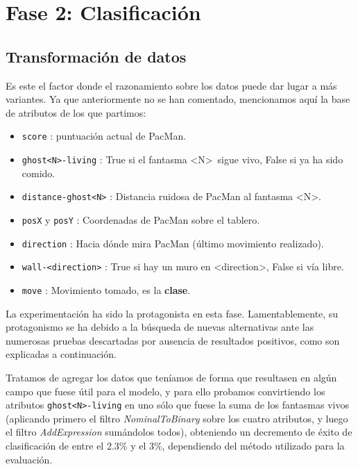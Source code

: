 \documentclass[12pt]{article}
\begin{document}
\newpage
\section{Fase 2: Clasificación}

\subsection{Transformación de datos}

Es este el factor donde el razonamiento sobre los datos puede dar lugar a más variantes. Ya que anteriormente no se han comentado, mencionamos aquí la base de atributos de los que partimos:
\begin{itemize}
    \item \texttt{score} : puntuación actual de PacMan.
    \item \texttt{ghost<N>-living} : True si el fantasma \textless N\textgreater\ sigue vivo, False si ya ha sido comido.
    \item \texttt{distance-ghost<N>} : Distancia ruidosa de PacMan al fantasma \textless N\textgreater.
    \item \texttt{posX} y \texttt{posY} : Coordenadas de PacMan sobre el tablero.
    \item \texttt{direction} : Hacia dónde mira PacMan (último movimiento realizado).
    \item \texttt{wall-<direction>} : True si hay un muro en \textless direction\textgreater, False si vía libre.
    \item \texttt{move} : Movimiento tomado, es la \textbf{clase}.
\end{itemize}

La experimentación ha sido la protagonista en esta fase. Lamentablemente, su protagonismo se ha debido a la búsqueda de nuevas alternativas ante las numerosas pruebas descartadas por ausencia de resultados positivos, como son explicadas a continuación.

\vspace{0.2cm}

Tratamos de agregar los datos que teníamos de forma que resultasen en algún campo que fuese útil para el modelo, y para ello probamos convirtiendo los atributos \texttt{ghost<N>-living} en uno sólo que fuese la suma de los fantasmas vivos (aplicando primero el filtro \emph{NominalToBinary} sobre los cuatro atributos, y luego el filtro \emph{AddExpression} sumándolos todos), obteniendo un decremento de éxito de clasificación de entre el 2.3\% y el 3\%, dependiendo del método utilizado para la evaluación.
\end{document}
